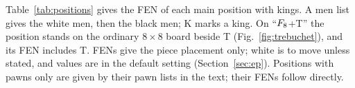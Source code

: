 \label{app:positions}

Table~\ref{tab:positions} gives the FEN of each main position with kings. A men list gives the white men, then
the black men; K marks a king. On ``$F_{8}$+T'' the position stands on the ordinary
$8\times8$ board beside T (Fig.~\ref{fig:trebuchet}), and its FEN includes T. FENs give the piece placement
only; white is to move unless stated, and values are in the default setting (Section~\ref{sec:ep}). Positions
with pawns only are given by their pawn lists in the text; their FENs follow directly.
